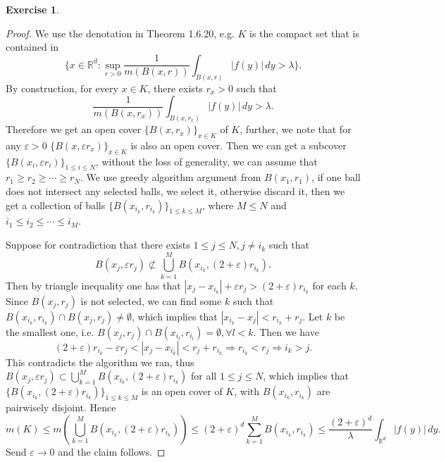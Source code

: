 \documentclass[a4paper]{article}
\newtheorem{ex}{Exercise}[subsection]
\begin{document}
\begin{ex}\end{ex}\begin{proof}
We use the denotation in Theorem 1.6.20, e.g. $K$ is the compact set that is contained in $$
\{x \in \mathbb{R}^d : \sup_{r > 0}\frac{1}{m(B(x, r))}\int_{B(x, r)}|f(y)|\,dy >\lambda\}.
$$By construction, for every $x \in K$, there exists $r_x > 0$ such that $$
\frac{1}{m(B(x, r_x))}\int_{B(x, r_x)}|f(y)|\,dy > \lambda.
$$Therefore we get an open cover $\{B(x, r_x)\}_{x \in K}$ of $K$, further, we note that for any $\varepsilon > 0$
$\{B(x, \varepsilon r_x)\}_{x \in K}$ is also an open cover. Then we can get a subcover 
$\{B(x_i, \varepsilon r_i)\}_{1 \leq i \leq N}$, without the loss of generality, we can assume that 
$r_1 \geq r_2 \geq \cdots \geq r_N$. We use greedy algorithm argument from $B(x_1, r_1)$, if one ball does not 
intersect any selected balls, we select it, otherwise discard it, then we get a collection of balls 
$\{B(x_{i_k}, r_{i_k})\}_{1 \leq k \leq M}$, where $M \leq N$ and $i_1 \leq i_2 \leq \cdots \leq i_M$.

Suppose for contradiction that there exists $1 \leq j \leq N, j \ne i_k$ such that 
$$B(x_j, \varepsilon r_j) \not\subset \bigcup_{k = 1}^M B(x_{i_k}, (2 + \varepsilon)r_{i_k}).$$
Then by triangle inequality one has that $|x_j - x_{i_k}| + \varepsilon r_j > (2 + \varepsilon)r_{i_k}$ for each $k$.
Since $B(x_j, r_j)$ is not selected, we can find some $k$ such that $B(x_{i_k}, r_{i_k}) \cap B(x_j, r_j) \ne \emptyset$,
which implies that $|x_{i_k} - x_j| < r_{i_k} + r_j$. Let $k$ be the smallest one, i.e. 
$B(x_j, r_j) \cap B(x_{i_l}, r_{i_l}) = \emptyset, \forall l < k$. Then we have$$
(2 + \varepsilon)r_{i_k} - \varepsilon r_j < |x_j - x_{i_k}| < r_j + r_{i_k} \Rightarrow r_{i_k} < r_j \Rightarrow 
i_k > j.
$$This contradicts the algorithm we ran, thus $B(x_j, \varepsilon r_j) \subset \bigcup_{k = 1}^M B(x_{i_k}, (2 + \varepsilon)r_{i_k})$
for all $1 \leq j \leq N$, which implies that $\{B(x_{i_k}, (2 + \varepsilon)r_{i_k})\}_{1 \leq k \leq M}$ is an open cover of $K$,
with $B(x_{i_k}, r_{i_k})$ are pairwisely disjoint. Hence $$
m(K) \leq m(\bigcup_{k = 1}^M B(x_{i_k}, (2 + \varepsilon)r_{i_k})) \leq (2 + \varepsilon)^d \sum_{k = 1}^M B(x_{i_k}, r_{i_k})
\leq \frac{(2 + \varepsilon)^d}{\lambda}\int_{\mathbb{R}^d} |f(y)|\,dy.
$$Send $\varepsilon \to 0$ and the claim follows.
\end{proof}
\end{document}
